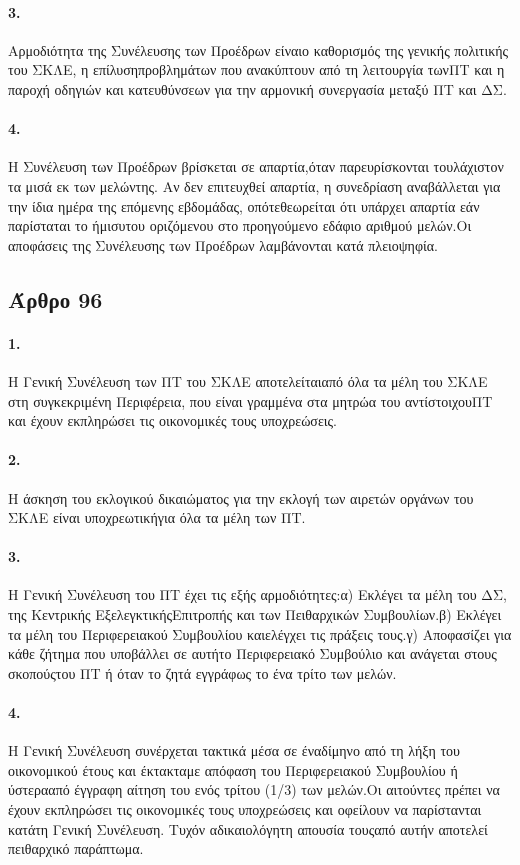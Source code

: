 \documentclass[a4paper,oneside, 10pt]{book}
\begin{document}
\paragraph { 3. } Αρμοδιότητα της Συνέλευσης των Προέδρων είναιο καθορισμός της γενικής πολιτικής του ΣΚΛΕ, η επίλυσηπροβλημάτων που ανακύπτουν από τη λειτουργία τωνΠΤ και η παροχή οδηγιών και κατευθύνσεων για την αρμονική συνεργασία μεταξύ ΠΤ και ΔΣ.
\paragraph { 4. } Η Συνέλευση των Προέδρων βρίσκεται σε απαρτία,όταν παρευρίσκονται τουλάχιστον τα μισά εκ των μελώντης. Αν δεν επιτευχθεί απαρτία, η συνεδρίαση αναβάλλεται για την ίδια ημέρα της επόμενης εβδομάδας, οπότεθεωρείται ότι υπάρχει απαρτία εάν παρίσταται το ήμισυτου οριζόμενου στο προηγούμενο εδάφιο αριθμού μελών.Οι αποφάσεις της Συνέλευσης των Προέδρων λαμβάνονται κατά πλειοψηφία.
\subsection*{ Άρθρο 96 }
\paragraph { 1. } Η Γενική Συνέλευση των ΠΤ του ΣΚΛΕ αποτελείταιαπό όλα τα μέλη του ΣΚΛΕ στη συγκεκριμένη Περιφέρεια, που είναι γραμμένα στα μητρώα του αντίστοιχουΠΤ και έχουν εκπληρώσει τις οικονομικές τους υποχρεώσεις.
\paragraph { 2. } Η άσκηση του εκλογικού δικαιώματος για την εκλογή των αιρετών οργάνων του ΣΚΛΕ είναι υποχρεωτικήγια όλα τα μέλη των ΠΤ.
\paragraph { 3. } Η Γενική Συνέλευση του ΠΤ έχει τις εξής αρμοδιότητες:α) Εκλέγει τα μέλη του ΔΣ, της Κεντρικής ΕξελεγκτικήςΕπιτροπής και των Πειθαρχικών Συμβουλίων.β) Εκλέγει τα μέλη του Περιφερειακού Συμβουλίου καιελέγχει τις πράξεις τους.γ) Αποφασίζει για κάθε ζήτημα που υποβάλλει σε αυτήτο Περιφερειακό Συμβούλιο και ανάγεται στους σκοπούςτου ΠΤ ή όταν το ζητά εγγράφως το ένα τρίτο των μελών.
\paragraph { 4. } Η Γενική Συνέλευση συνέρχεται τακτικά μέσα σε έναδίμηνο από τη λήξη του οικονομικού έτους και έκτακταμε απόφαση του Περιφερειακού Συμβουλίου ή ύστερααπό έγγραφη αίτηση του ενός τρίτου (1/3) των μελών.Οι αιτούντες πρέπει να έχουν εκπληρώσει τις οικονομικές τους υποχρεώσεις και οφείλουν να παρίστανται κατάτη Γενική Συνέλευση. Τυχόν αδικαιολόγητη απουσία τουςαπό αυτήν αποτελεί πειθαρχικό παράπτωμα.
\end{document}
